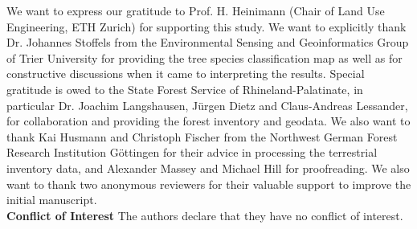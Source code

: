 \documentclass[twocolumn]{svjour3}            %
\begin{document}




















\begin{acknowledgements}
We want to express our gratitude to Prof. H. Heinimann (Chair of Land Use Engineering, ETH Zurich) for supporting this study. We want to explicitly thank Dr. Johannes Stoffels from the Environmental Sensing and Geoinformatics Group of Trier University for providing the tree species classification map as well as for constructive discussions when it came to interpreting the results. Special gratitude is owed to the State Forest Service of Rhineland-Palatinate, in particular Dr. Joachim Langshausen, Jürgen Dietz and Claus-Andreas Lessander, for collaboration and providing the forest inventory and geodata. We also want to thank Kai Husmann and Christoph Fischer from the Northwest German Forest Research Institution Göttingen for their advice in processing the terrestrial inventory data, and Alexander Massey and Michael Hill for proofreading. We also want to thank two anonymous reviewers for their valuable support to improve the initial manuscript.\\

\noindent \textbf{Conflict of Interest} The authors declare that they have no conflict of interest.

\end{acknowledgements}




\end{document}
